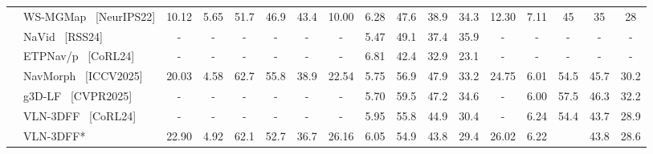 \documentclass{article}
\theoremstyle{plain}
\theoremstyle{definition}
\theoremstyle{remark}
\begin{document}
\begin{table}[thpb]
{\begin{threeparttable}
\begin{tabular}{@{}c|l|ccccccccccccccc@{}}
			\multicolumn{1}{c|}{} & WS-MGMap~\cite{Chen2022WeaklySupervisedMM} {\scriptsize {\color{Gray} [NeurIPS22]}}& 10.12 & 5.65 & 51.7 & 46.9 & \multicolumn{1}{c|}{43.4} & 10.00 & 6.28 & 47.6 & 38.9 & \multicolumn{1}{c|}{34.3} & 12.30 & 7.11 & 45 & 35 & 28 \\
			\multicolumn{1}{c|}{} & NaVid~\cite{zhang2024navid} {\scriptsize {\color{Gray} [RSS24]}}& - & - & - & - & \multicolumn{1}{c|}{-} & - & 5.47 & 49.1 & 37.4 & \multicolumn{1}{c|}{35.9} & - & - & - & - & - \\
			\multicolumn{1}{c|}{} & ETPNav/p~\cite{wang2024sim} {\scriptsize {\color{Gray} [CoRL24]}} & - & - & - & - & \multicolumn{1}{c|}{-} & - & 6.81 & 42.4 & 32.9 & \multicolumn{1}{c|}{23.1} & - & - & - & - & - \\ 
            \multicolumn{1}{c|}{} & NavMorph~\cite{Yao2025navmorph} {\scriptsize {\color{Gray} [ICCV2025]}} & 20.03 & 4.58 & 62.7 & 55.8 & \multicolumn{1}{c|}{38.9} & 22.54 & 5.75 & 56.9 & 47.9 & \multicolumn{1}{c|}{33.2} & 24.75 & 6.01 & 54.5 & 45.7 & 30.2 \\
            \multicolumn{1}{c|}{} & g3D-LF~\cite{wang2025g3d} {\scriptsize {\color{Gray} [CVPR2025]}}& - & - & - & - & \multicolumn{1}{c|}{-} & - & 5.70 & 59.5 & 47.2 &\multicolumn{1}{c|}{34.6} & - & 6.00 & 57.5 & 46.3 & 32.2 \\   
               \cmidrule(l){2-17} 
            \multicolumn{1}{c|}{} & VLN-3DFF~\cite{wang2024sim} {\scriptsize {\color{Gray} [CoRL24]}}& - & - & - & - & \multicolumn{1}{c|}{-} & - & 5.95 & 55.8 & 44.9 & \multicolumn{1}{c|}{30.4} & - & 6.24 & 54.4 & 43.7 & 28.9 \\
            	\multicolumn{1}{c|}{} & \cellcolor{gray!5}VLN-3DFF* & \cellcolor{gray!5}22.90 & \cellcolor{gray!5}4.92 & \cellcolor{gray!5}62.1 & \cellcolor{gray!5}52.7 & \multicolumn{1}{c|}{\cellcolor{gray!5}36.7} & \cellcolor{gray!5}26.16 & \cellcolor{gray!5}6.05 & \cellcolor{gray!5}54.9 & \cellcolor{gray!5}43.8 & \multicolumn{1}{c|}{\cellcolor{gray!5}29.4} & \cellcolor{gray!5}26.02 & \cellcolor{gray!5}6.22 & \cellcolor{gray!5}{54.7} & \cellcolor{gray!5}43.8 & \cellcolor{gray!5}28.6 \\

\end{tabular}
\end{threeparttable}}
\end{table}
\end{document}
